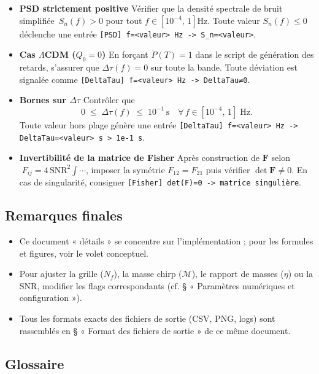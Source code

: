 \begin{itemize}
  \item \textbf{PSD strictement positive}
    Vérifier que la densité spectrale de bruit simplifiée
    \(\,S_{n}(f)>0\) pour tout
    \(f\in[10^{-4},\,1]\)\;Hz.
    Toute valeur \(S_{n}(f)\le0\) déclenche une entrée
    \verb|[PSD] f=<valeur> Hz -> S_n=<valeur>|.

  \item \textbf{Cas \(\Lambda\)CDM (\(Q_{0}=0\))}
    En forçant \(\dot P(T)=1\) dans le script de génération des retards,
    s’assurer que \(\Delta\tau(f)=0\) sur toute la bande.
    Toute déviation est signalée comme \verb|[DeltaTau] f=<valeur> Hz -> DeltaTau≠0|.

  \item \textbf{Bornes sur \(\Delta\tau\)}
    Contrôler que
    \[
      0 \;\le\;\Delta\tau(f)\;\le\;10^{-1}\,\mathrm{s}
      \quad\forall\,f\in[10^{-4},\,1]\;\mathrm{Hz}.
    \]
    Toute valeur hors plage génère une entrée
    \verb|[DeltaTau] f=<valeur> Hz -> DeltaTau=<valeur> s > 1e-1 s|.

  \item \textbf{Invertibilité de la matrice de Fisher}
    Après construction de
    \(\mathbf{F}\) selon
    \(\;F_{ij}=4\,\mathrm{SNR}^{2}\int\cdots\),
    imposer la symétrie \(F_{12}=F_{21}\) puis vérifier
    \(\det\mathbf{F}\neq0\).
    En cas de singularité, consigner
    \verb|[Fisher] det(F)=0 -> matrice singulière|.
\end{itemize}

\subsection{Remarques finales}
\begin{itemize}
  \item Ce document « détails » se concentre sur l’implémentation ; pour les formules et figures, voir le volet conceptuel.
  \item Pour ajuster la grille (\(N_f\)), la masse chirp (\(\mathcal{M}\)), le rapport de masses (\(\eta\)) ou la SNR, modifier les flags correspondants (cf. § « Paramètres numériques et configuration »).
  \item Tous les formats exacts des fichiers de sortie (CSV, PNG, logs) sont rassemblés en § « Format des fichiers de sortie » de ce même document.
\end{itemize}

\subsection*{Glossaire}

